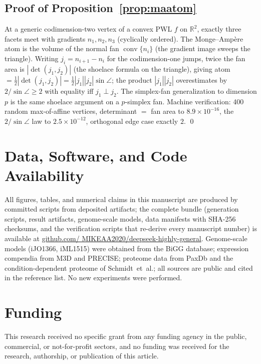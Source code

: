 \documentclass[11pt,a4paper]{article}
\theoremstyle{plain}
\theoremstyle{definition}
\theoremstyle{remark}
\newcommand{\RR}{\mathbb{R}}
\begin{document}
\subsection{Proof of Proposition~\ref{prop:maatom}}

At a generic codimension-two vertex of a convex PWL $f$ on
$\RR^2$, exactly three facets meet with gradients $n_1, n_2, n_3$
(cyclically ordered). The Monge--Amp\`ere atom is the volume of
the normal fan $\operatorname{conv}\{n_i\}$ (the gradient image
sweeps the triangle). Writing $j_i = n_{i+1} - n_i$ for the
codimension-one jumps, twice the fan area is $|\det(j_1, j_2)|$
(the shoelace formula on the triangle), giving atom $=
\tfrac12|\det(j_1, j_2)| = \tfrac12 |j_1||j_2| \sin\angle$; the
product $|j_1||j_2|$ overestimates by $2/\sin\angle \ge 2$ with
equality iff $j_1 \perp j_2$. The simplex-fan generalization to
dimension $p$ is the same shoelace argument on a $p$-simplex fan.
Machine verification: 400 random max-of-affine vertices,
determinant $=$ fan area to $8.9 \times 10^{-16}$, the
$2/\sin\angle$ law to $2.5 \times 10^{-12}$, orthogonal edge case
exactly $2$. \qed
\vspace{0.6em}
\section*{Data, Software, and Code Availability}
All figures, tables, and numerical claims in this manuscript are
produced by committed scripts from deposited artifacts; the complete
bundle (generation scripts, result artifacts, genome-scale models,
data manifests with SHA-256 checksums, and the verification
scripts that re-derive every manuscript number) is available at
\href{https://github.com/MIKEAA2020/deepseek-highly-general}{github.com/
MIKEAA2020/deepseek-highly-general}. Genome-scale models
(iJO1366, iML1515) were obtained from the BiGG database; expression
compendia from M3D and PRECISE; proteome data from PaxDb and the
condition-dependent proteome of Schmidt~et~al.; all sources are
public and cited in the reference list. No new experiments were
performed.

\section*{Funding}
This research received no specific grant from any funding agency in
the public, commercial, or not-for-profit sectors, and no funding
was received for the research, authorship, or publication of this
article.
\end{document}
